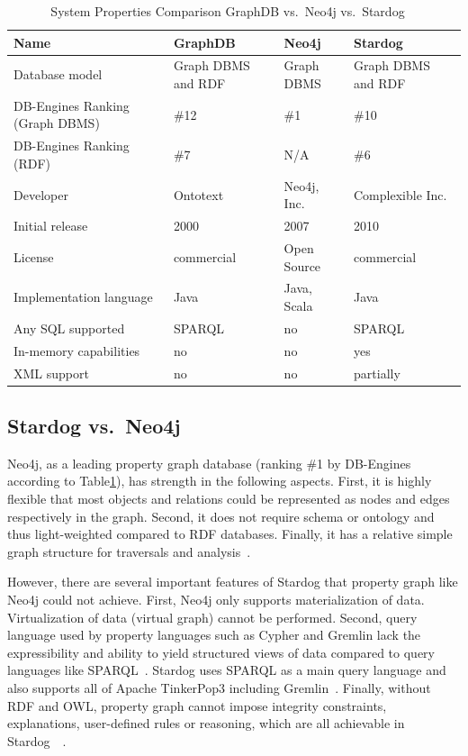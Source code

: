 	\begin{table}[htb]
		\centering
		\caption{System Properties Comparison GraphDB vs.\ Neo4j vs.\ 
		Stardog~\cite{hid-sp18-405-www-stardog-dbengines-neo4j}~\cite{hid-sp18-405-www-stardog-dbengines-graphdb}}\label{t:comparison}
		\begin{tabular}{llll}
		Name & GraphDB & Neo4j & Stardog \\
		\toprule
		Database model&	Graph DBMS and RDF & Graph DBMS & Graph DBMS 
		and RDF \\
		\midrule
		DB-Engines Ranking (Graph DBMS) &\#12 &\#1 &\#10\\
		\midrule
		DB-Engines Ranking (RDF) &\#7 &N/A &\#6\\
		\midrule
		Developer & Ontotext &	Neo4j, Inc.	& Complexible Inc.\\
		\midrule
		Initial release	&2000 &	2007&	2010\\
		\midrule
		License &	commercial &	Open Source &	commercial \\
		\midrule
		Implementation language &	Java &	Java, Scala &	Java\\
		\midrule
		Any SQL supported &	SPARQL &	no	& SPARQL \\
		\midrule
		In-memory capabilities&no &no &			yes\\
		\midrule
		XML support&	no	& no& 	partially\\
		\bottomrule
		\end{tabular}
	\end{table}

	\subsection{Stardog vs.\ Neo4j}
		Neo4j, as a leading property graph database (ranking \#1 by DB-Engines 
		according to Table\ref{t:comparison}), has strength in the following 
		aspects. First, it is highly flexible that most objects and relations could 
		be represented as nodes and edges respectively in the graph. Second, it 
		does not require schema or ontology and thus light-weighted compared 
		to RDF databases. Finally, it has a relative simple graph structure for 
		traversals and 
		analysis~\cite{hid-sp18-405-robinson2013graphdatabase-stardog}. 
		
		However, there are several important features of Stardog that property 
		graph like Neo4j could not achieve. First, Neo4j only supports 
		materialization of data. Virtualization of data (virtual graph) cannot be 
		performed. Second, query language used by property languages such 
		as Cypher and Gremlin lack the expressibility and ability to yield 
		structured views of data compared to query languages like 
		SPARQL~\cite{hid-sp18-405-angles2008expre-stardog}. 
		Stardog uses SPARQL as a main query language and also supports all of 
		Apache TinkerPop3 including 
		Gremlin~\cite{hid-sp18-405-www-stardog-docs}. Finally, without RDF 
		and OWL, property graph cannot impose integrity constraints, 
		explanations, user-defined rules or reasoning, which are all achievable in 
		Stardog~\cite{hid-sp18-405-www-stardog-dbengines-neo4j}~\cite{hid-sp18-405-www-stardog-docs}.
	 
